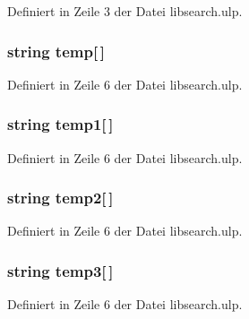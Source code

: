 Definiert in Zeile 3 der Datei libsearch.\+ulp.

\hypertarget{libsearch_8ulp_a2f8d954bdd72eba003a9802a6248de83}{}
\subsubsection[{temp}]{\setlength{\rightskip}{0pt plus 5cm}string temp\mbox{[}$\,$\mbox{]}}\label{libsearch_8ulp_a2f8d954bdd72eba003a9802a6248de83}


Definiert in Zeile 6 der Datei libsearch.\+ulp.

\hypertarget{libsearch_8ulp_a1739e013da948312edaaa3ade1bd7f7a}{}
\subsubsection[{temp1}]{\setlength{\rightskip}{0pt plus 5cm}string temp1\mbox{[}$\,$\mbox{]}}\label{libsearch_8ulp_a1739e013da948312edaaa3ade1bd7f7a}


Definiert in Zeile 6 der Datei libsearch.\+ulp.

\hypertarget{libsearch_8ulp_a93cd3f3f743b20e134149e06efa22a88}{}
\subsubsection[{temp2}]{\setlength{\rightskip}{0pt plus 5cm}string temp2\mbox{[}$\,$\mbox{]}}\label{libsearch_8ulp_a93cd3f3f743b20e134149e06efa22a88}


Definiert in Zeile 6 der Datei libsearch.\+ulp.

\hypertarget{libsearch_8ulp_a6d07a7b1d2f2bb3e3061eba3b676dd44}{}
\subsubsection[{temp3}]{\setlength{\rightskip}{0pt plus 5cm}string temp3\mbox{[}$\,$\mbox{]}}\label{libsearch_8ulp_a6d07a7b1d2f2bb3e3061eba3b676dd44}


Definiert in Zeile 6 der Datei libsearch.\+ulp.

\hypertarget{libsearch_8ulp_ad6a0fc9c82629f46ca764b920e57db24}{}
